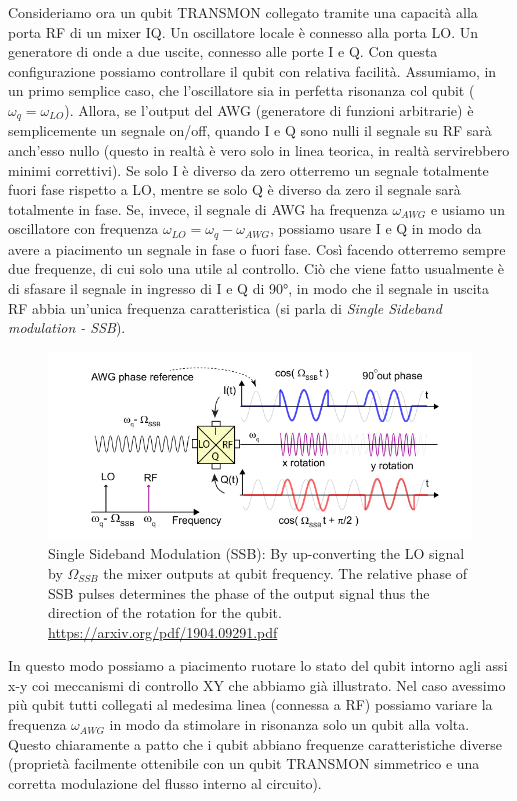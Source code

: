 \vspace{0.5cm}

\noindent Consideriamo ora un qubit TRANSMON collegato tramite una capacità alla porta RF di un mixer IQ. Un oscillatore locale è connesso alla porta LO. Un generatore di onde a due uscite, connesso alle porte I e Q.
Con questa configurazione possiamo controllare il qubit con relativa facilità.
Assumiamo, in un primo semplice caso, che l'oscillatore sia in perfetta risonanza col qubit ($\omega_q = \omega_{LO}$). Allora, se l'output del AWG (generatore di funzioni arbitrarie) è semplicemente un segnale on/off, quando I e Q sono nulli il segnale su RF sarà anch'esso nullo (questo in realtà è vero solo in linea teorica, in realtà servirebbero minimi correttivi). Se solo I è diverso da zero otterremo un segnale totalmente fuori fase rispetto a LO, mentre se solo Q è diverso da zero il segnale sarà totalmente in fase.
Se, invece, il segnale di AWG ha frequenza $\omega_{AWG}$ e usiamo un oscillatore con frequenza $\omega_{LO}=\omega_q - \omega_{AWG}$, possiamo usare I e Q in modo da avere a piacimento un segnale in fase o fuori fase. Così facendo otterremo sempre due frequenze, di cui solo una utile al controllo. Ciò che viene fatto usualmente è di sfasare il segnale in ingresso di I e Q di 90°, in modo che il segnale in uscita RF abbia un'unica frequenza caratteristica (si parla di \textit{Single Sideband modulation - SSB}).
\begin{figure}[H]
    \centering
    \includegraphics[width= \textwidth]{images/single_sideband_modulation.png}
    \caption{Single Sideband Modulation (SSB): By up-converting the LO signal by $\Omega_{SSB}$ the mixer
outputs at qubit frequency. The relative phase of SSB pulses determines the phase of the output signal thus
the direction of the rotation for the qubit. \url{https://arxiv.org/pdf/1904.09291.pdf}}
\end{figure}
\noindent In questo modo possiamo a piacimento ruotare lo stato del qubit intorno agli assi x-y coi meccanismi di controllo XY che abbiamo già illustrato.
Nel caso avessimo più qubit tutti collegati al medesima linea (connessa a RF) possiamo variare la frequenza $\omega_{AWG}$ in modo da stimolare in risonanza solo un qubit alla volta. Questo chiaramente a patto che i qubit abbiano frequenze caratteristiche diverse (proprietà facilmente ottenibile con un qubit TRANSMON simmetrico e una corretta modulazione del flusso interno al circuito).


